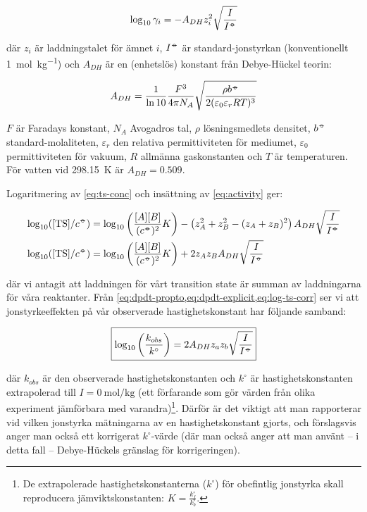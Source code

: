 \begin{equation}
  \label{eq:activity}
  \log_{10}\gamma_i = -A_{DH}z_i^2\sqrt{\frac{I}{I^{-\kern-5pt{\circ}\kern-5pt-}}}
\end{equation}

där $z_i$ är laddningstalet för ämnet $i$, $I^{-\kern-5pt{\circ}\kern-5pt-}$ är
standard-jonstyrkan (konventionellt \SI{1}{\mole\per\kg}) och $A_{DH}$
är en (enhetslös) konstant från Debye-Hückel teorin:

\begin{equation}
  \label{eq:debye-huckel-a}
  A_{DH} = \frac{1}{\ln 10} \frac{F^3}{4\pi N_A}\sqrt{\frac{\rho b^{-\kern-5pt{\circ}\kern-5pt-}}{2(\varepsilon_0\varepsilon_rRT)^3}}
\end{equation}

$F$ är Faradays konstant, $N_A$ Avogadros tal, $\rho$ lösningsmedlets
densitet, $b^{{-\kern-5pt{\circ}\kern-5pt-}}$ standard-molaliteten, $\varepsilon_r$ den
relativa permittiviteten för mediumet, $\varepsilon_0$ permittiviteten för
vakuum, $R$ allmänna gaskonstanten och $T$ är temperaturen. För vatten vid
\SI{298.15}{\kelvin} är $A_{DH} = 0.509$.

Logaritmering av \cref{eq:ts-conc} och insättning av \cref{eq:activity}
ger:

\begin{align}
  \log_{10}([\ce{TS}] / c^\plimsoll) &= \log_{10}\left(
    \frac{[A][B]}{(c^\plimsoll)^2}K \right) - \left(z_A^2 + z_B^2 - (z_A+z_B)^2\right) A_{DH}
    \sqrt{\frac{I}{I^\plimsoll}} \\
  \label{eq:log-ts-corr}
  \log_{10}([\ce{TS}] / c^\plimsoll) &= \log_{10}
    \left(\frac{[A][B]}{(c^\plimsoll)^2}K
    \right) + 2z_Az_BA_{DH}\sqrt{\frac{I}{I^\plimsoll}}
\end{align}

där vi antagit att laddningen för vårt transition state är summan av
laddningarna för våra reaktanter.
Från \cref{eq:dpdt-propto,eq:dpdt-explicit,eq:log-ts-corr} ser vi att jonstyrkeeffekten
på vår observerade hastighetskonstant har följande samband:

\begin{align}
  \label{eq:kinetic-salt}
  \boxed{
  \log_{10} \left( \frac{k_{obs}}{k^{\circ}} \right) = 2A_{DH}z_az_b\sqrt{\frac{I}{I^{-\kern-5pt{\circ}\kern-5pt-}}}
  }
\end{align}

där $k_{obs}$ är den observerade hastighetskonstanten och $k^{\circ}$ är
hastighetskonstanten extrapolerad till $I = \SI{0}{\mole\per\kg}$ (ett
förfarande som gör värden från olika experiment jämförbara med
varandra)\footnote{
 De extrapolerade hastighetskonstanterna ($k^\circ$) för obefintlig
 jonstyrka skall reproducera jämviktskonstanten: $K =
 \frac{k^\circ_{f}}{k^\circ_{b}}$.
}. Därför är det viktigt att man rapporterar vid vilken jonstyrka
mätningarna av en hastighetskonstant gjorts, och förslagsvis anger man
också ett korrigerat $k^\circ$-värde (där man också anger att man använt
-- i detta fall -- Debye-Hückels gränslag för korrigeringen).

